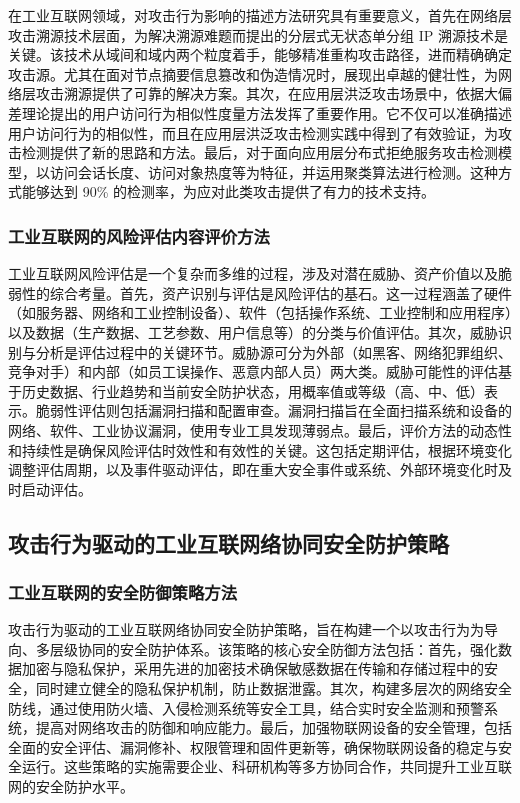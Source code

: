 在工业互联网领域，对攻击行为影响的描述方法研究具有重要意义，首先在网络层攻击溯源技术层面，为解决溯源难题而提出的分层式无状态单分组 IP 溯源技术是关键。该技术从域间和域内两个粒度着手，能够精准重构攻击路径，进而精确确定攻击源。尤其在面对节点摘要信息篡改和伪造情况时，展现出卓越的健壮性，为网络层攻击溯源提供了可靠的解决方案。其次，在应用层洪泛攻击场景中，依据大偏差理论提出的用户访问行为相似性度量方法发挥了重要作用。它不仅可以准确描述用户访问行为的相似性，而且在应用层洪泛攻击检测实践中得到了有效验证，为攻击检测提供了新的思路和方法。最后，对于面向应用层分布式拒绝服务攻击检测模型，以访问会话长度、访问对象热度等为特征，并运用聚类算法进行检测。这种方式能够达到 90\% 的检测率，为应对此类攻击提供了有力的技术支持。


\subsubsection{工业互联网的风险评估内容评价方法}

工业互联网风险评估是一个复杂而多维的过程，涉及对潜在威胁、资产价值以及脆弱性的综合考量。首先，资产识别与评估是风险评估的基石。这一过程涵盖了硬件（如服务器、网络和工业控制设备）、软件（包括操作系统、工业控制和应用程序）以及数据（生产数据、工艺参数、用户信息等）的分类与价值评估。其次，威胁识别与分析是评估过程中的关键环节。威胁源可分为外部（如黑客、网络犯罪组织、竞争对手）和内部（如员工误操作、恶意内部人员）两大类。威胁可能性的评估基于历史数据、行业趋势和当前安全防护状态，用概率值或等级（高、中、低）表示。脆弱性评估则包括漏洞扫描和配置审查。漏洞扫描旨在全面扫描系统和设备的网络、软件、工业协议漏洞，使用专业工具发现薄弱点。最后，评价方法的动态性和持续性是确保风险评估时效性和有效性的关键。这包括定期评估，根据环境变化调整评估周期，以及事件驱动评估，即在重大安全事件或系统、外部环境变化时及时启动评估。


\subsection{攻击行为驱动的工业互联网络协同安全防护策略}

\subsubsection{工业互联网的安全防御策略方法}

攻击行为驱动的工业互联网络协同安全防护策略，旨在构建一个以攻击行为为导向、多层级协同的安全防护体系。该策略的核心安全防御方法包括：首先，强化数据加密与隐私保护，采用先进的加密技术确保敏感数据在传输和存储过程中的安全，同时建立健全的隐私保护机制，防止数据泄露。其次，构建多层次的网络安全防线，通过使用防火墙、入侵检测系统等安全工具，结合实时安全监测和预警系统，提高对网络攻击的防御和响应能力。最后，加强物联网设备的安全管理，包括全面的安全评估、漏洞修补、权限管理和固件更新等，确保物联网设备的稳定与安全运行。这些策略的实施需要企业、科研机构等多方协同合作，共同提升工业互联网的安全防护水平。


